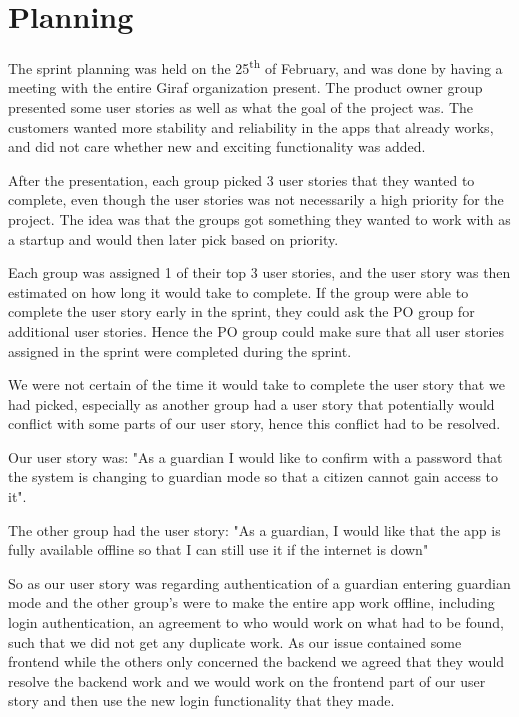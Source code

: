 \section{Planning}
The sprint planning was held on the 25\textsuperscript{th} of February, and was done by having a meeting with the entire Giraf organization present. 
The product owner group presented some user stories as well as what the goal of the project was. 
The customers wanted more stability and reliability in the apps that already works, and did not care whether new and exciting functionality was added. 

After the presentation, each group picked 3 user stories that they wanted to complete, even though the user stories was not necessarily a high priority for the project. 
The idea was that the groups got something they wanted to work with as a startup and would then later pick based on priority.

Each group was assigned 1 of their top 3 user stories, and the user story was then estimated on how long it would take to complete.
If the group were able to complete the user story early in the sprint, they could ask the PO group for additional user stories.
Hence the PO group could make sure that all user stories assigned in the sprint were completed during the sprint.

We were not certain of the time it would take to complete the user story that we had picked, especially as another group had a user story that potentially would conflict with some parts of our user story, hence this conflict had to be resolved.
 
Our user story was: "As a guardian I would like to confirm with a password that the system is changing to guardian mode so that a citizen cannot gain access to it".

The other group had the user story: "As a guardian, I would like that the app is fully available offline so that I can still use it if the internet is down"

So as our user story was regarding authentication of a guardian entering guardian mode and the other group's were to make the entire app work offline, including login authentication, an agreement to who would work on what had to be found, such that we did not get any duplicate work.
As our issue contained some frontend while the others only concerned the backend we agreed that they would resolve the backend work and we would work on the frontend part of our user story and then use the new login functionality that they made.